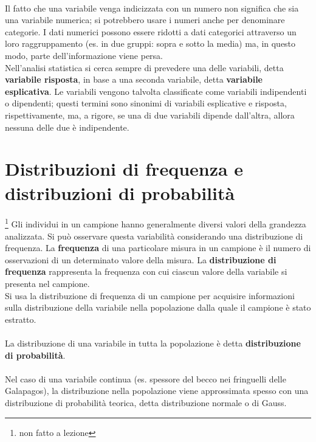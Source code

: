 \documentclass[10pt, draft]{book}
\begin{document}
\\
Il fatto che una variabile venga indicizzata con un numero non significa che sia una variabile numerica; si potrebbero usare i numeri anche per denominare categorie. I dati numerici possono essere ridotti a dati categorici attraverso un loro raggruppamento (es. in due gruppi: sopra e sotto la media) ma, in questo modo, parte dell'informazione viene persa.
\\
Nell'analisi statistica si cerca sempre di prevedere una delle variabili, detta \textbf{variabile risposta}, in base a una seconda variabile, detta \textbf{variabile esplicativa}. Le variabili vengono talvolta classificate come variabili indipendenti o dipendenti; questi termini sono sinonimi di variabili esplicative e risposta, rispettivamente, ma, a rigore, se una di due variabili dipende dall'altra, allora nessuna delle due è indipendente.

\section{Distribuzioni di frequenza e distribuzioni di probabilità}\footnote{non fatto a lezione}
Gli individui in un campione hanno generalmente diversi valori della grandezza analizzata. Si può osservare questa variabilità considerando una distribuzione di frequenza. La \textbf{frequenza} di una particolare misura in un campione è il numero di osservazioni di un determinato valore della misura. La \textbf{distribuzione di frequenza} rappresenta la frequenza con cui ciascun valore della variabile si presenta nel campione.
\\
Si usa la distribuzione di frequenza di un campione per acquisire informazioni sulla distribuzione della variabile nella popolazione dalla quale il campione è stato estratto.
\\
\\
La distribuzione di una variabile in tutta la popolazione è detta \textbf{distribuzione di probabilità}.
\\
\\
Nel caso di una variabile continua (es. spessore del becco nei fringuelli delle Galapagos), la distribuzione nella popolazione viene approssimata spesso con una distribuzione di probabilità teorica, detta distribuzione normale o di Gauss.
\end{document}
